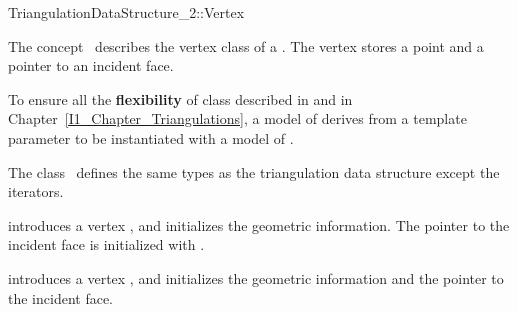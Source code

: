 

\begin{ccRefConcept}{TriangulationDataStructure_2::Vertex}


\ccDefinition
  
The concept \ccRefName\ describes the vertex class of a
.
The vertex stores a point and a pointer to an incident face.

To ensure all the \textbf{flexibility} of class 
described in 
and in Chapter~\ref{I1_Chapter_Triangulations}, a model of 
\ccRefName derives from a template parameter
 to be instantiated with a model of 
.


\ccTypes
The class \ccRefName\ defines the same types as 
the triangulation data structure 
except the iterators.


\begin{ccAdvanced}
\ccCreation



{introduces a vertex \ccVar, and initializes the geometric information.
The pointer to the incident face is initialized with .}

{introduces a vertex \ccVar, and initializes the geometric information and 
the pointer to the incident face.}


\end{ccAdvanced}
\end{ccRefConcept}

